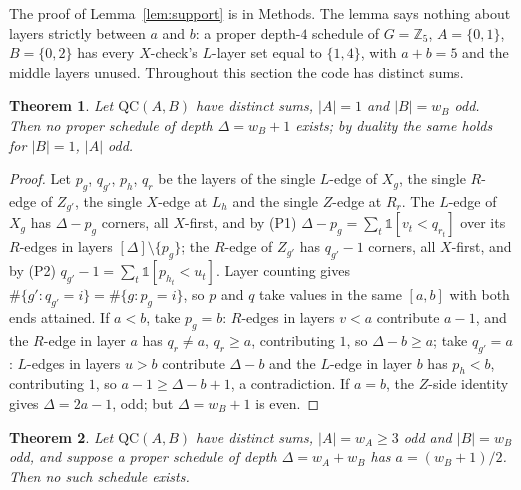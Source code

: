 \documentclass[reprint,twocolumn,superscriptaddress,nofootinbib]{revtex4-2}
\theoremstyle{plain}
\newtheorem{theorem}{Theorem}
\newcommand{\wA}{w_A}                  %
\newcommand{\wB}{w_B}
\begin{document}
The proof of Lemma~\ref{lem:support} is in Methods. The lemma says nothing
about layers strictly between $a$ and $b$: a proper depth-$4$ schedule of
$G=\mathbb{Z}_5$, $A=\{0,1\}$, $B=\{0,2\}$ has every $X$-check's $L$-layer
set equal to $\{1,4\}$, with $a+b=5$ and the middle layers unused.
Throughout this section the code has distinct sums.

\begin{theorem}
\label{thm:S1}
Let $\mathrm{QC}(A,B)$ have distinct sums, $|A|=1$ and $|B|=\wB$ odd.
Then no proper schedule of depth $\Delta=\wB+1$ exists; by duality the
same holds for $|B|=1$, $|A|$ odd.
\end{theorem}

\begin{proof}
Let $p_g$, $q_{g'}$, $p_h$, $q_r$ be the layers of the single $L$-edge of
$X_g$, the single $R$-edge of $Z_{g'}$, the single $X$-edge at $L_h$ and
the single $Z$-edge at $R_r$. The $L$-edge of $X_g$ has $\Delta-p_g$
corners, all $X$-first, and by (P1)
$\Delta-p_g=\sum_t\mathbb{1}[v_t<q_{r_t}]$ over its $R$-edges in layers
$[\Delta]\setminus\{p_g\}$; the $R$-edge of $Z_{g'}$ has $q_{g'}-1$
corners, all $X$-first, and by (P2)
$q_{g'}-1=\sum_t\mathbb{1}[p_{h_t}<u_t]$. Layer counting gives
$\#\{g':q_{g'}=i\}=\#\{g:p_g=i\}$, so $p$ and $q$ take values in the same
$[a,b]$ with both ends attained. If $a<b$, take $p_g=b$: $R$-edges in
layers $v<a$ contribute $a-1$, and the $R$-edge in layer $a$ has
$q_r\neq a$, $q_r\ge a$, contributing $1$, so $\Delta-b\ge a$; take
$q_{g'}=a$: $L$-edges in layers $u>b$ contribute $\Delta-b$ and the
$L$-edge in layer $b$ has $p_h<b$, contributing $1$, so
$a-1\ge\Delta-b+1$, a contradiction. If $a=b$, the $Z$-side identity gives
$\Delta=2a-1$, odd; but $\Delta=\wB+1$ is even.
\end{proof}

\begin{theorem}
\label{thm:S2}
Let $\mathrm{QC}(A,B)$ have distinct sums, $|A|=\wA\ge3$ odd and
$|B|=\wB$ odd, and suppose a proper schedule of depth $\Delta=\wA+\wB$ has
$a=(\wB+1)/2$. Then no such schedule exists.
\end{theorem}
\end{document}
